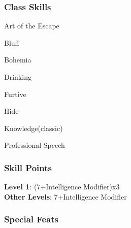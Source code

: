 \documentclass[ letterpaper,12pt]{article}
\begin{document}
{\subsubsection{Class Skills}
\begin{itemize}
{\it 
\item{Art of the Escape}
\item{Bluff}
\item{Bohemia}
\item{Drinking}
\item{Furtive}
\item{Hide}
\item{Knowledge(classic)}
\item{Professional Speech}
}
\end{itemize}

\subsubsection{Skill Points}
{\bf Level 1}: (7+Intelligence Modifier)x3\\
{\bf Other Levels}: 7+Intelligence Modifier\\

\subsubsection{Special Feats}

}
\end{document}
